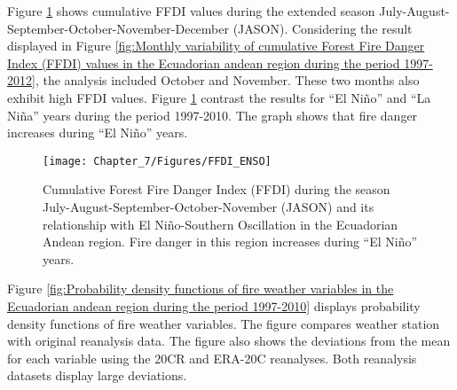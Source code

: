 Figure \ref{fig:Cumulative Forest Fire Danger Index (FFDI) during the season July-August-September-October-Novermber (JASON) and its relationship with El Ni=0000F1o-Southern Oscillation in the Ecuadorian Andean region}
shows cumulative FFDI values during the extended season July-August-September-October-November-December
(JASON). Considering the result displayed in Figure \ref{fig:Monthly variability of cumulative Forest Fire Danger Index (FFDI) values in the Ecuadorian andean region during the period 1997-2012},
the analysis included October and November. These two months also
exhibit high FFDI values. Figure \ref{fig:Cumulative Forest Fire Danger Index (FFDI) during the season July-August-September-October-Novermber (JASON) and its relationship with El Ni=0000F1o-Southern Oscillation in the Ecuadorian Andean region}
contrast the results for \textquotedblleft El Ni\~no\textquotedblright{}
and \textquotedblleft La Ni\~na\textquotedblright{} years during the
period 1997-2010. The graph shows that fire danger increases during
\textquotedblleft El Ni\~no\textquotedblright{} years.

\begin{figure}[h]
\noindent \begin{centering}
\texttt{[image: Chapter\_7/Figures/FFDI\_ENSO]}
\par\end{centering}

\caption[Cumulative Forest Fire Danger Index (FFDI) during the season July-August-September-October-November
(JASON) and its relationship with El Ni\~no-Southern Oscillation in
the Ecuadorian Andean region]{Cumulative Forest Fire Danger Index (FFDI) during the season July-August-September-October-November
(JASON) and its relationship with El Ni\~no-Southern Oscillation in
the Ecuadorian Andean region. Fire danger in this region increases
during ``El Ni\~no'' years. \label{fig:Cumulative Forest Fire Danger Index (FFDI) during the season July-August-September-October-Novermber (JASON) and its relationship with El Ni=0000F1o-Southern Oscillation in the Ecuadorian Andean region} }


\end{figure}


Figure \ref{fig:Probability density functions of fire weather variables in the Ecuadorian andean region during the period 1997-2010}
displays probability density functions of fire weather variables.
The figure compares weather station with original reanalysis data.
The figure also shows the deviations from the mean for each variable
using the 20CR and ERA-20C reanalyses. Both reanalysis datasets display
large deviations. 

